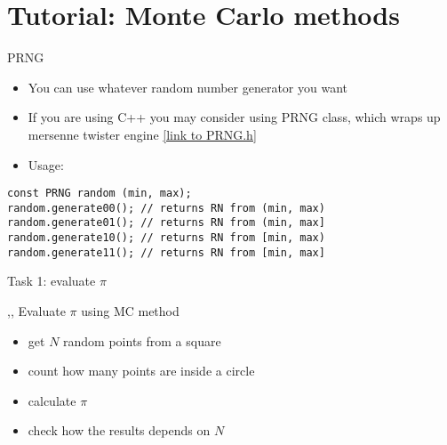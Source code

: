 \section[toc=Tutorial MC]{Tutorial: Monte Carlo methods}

\begin{slide}[method=direct]{PRNG}
\null\vfill

  \begin{itemize}
   \item You can use whatever random number generator you want
   \item If you are using C++ you may consider using PRNG class, which wraps up mersenne twister engine \href{https://raw.githubusercontent.com/TomaszGolan/simpleClassifiers/master/include/PRNG.h}{[link to PRNG.h]}
   \item Usage:
   
  \end{itemize}

  \begin{verbatim}
const PRNG random (min, max);
random.generate00(); // returns RN from (min, max)
random.generate01(); // returns RN from (min, max]
random.generate10(); // returns RN from [min, max)
random.generate11(); // returns RN from [min, max]
   \end{verbatim}

\vfill\null
\end{slide}

\begin{slide}[toc = Task 1]{Task 1: evaluate $\pi$}
\null\vfill

  \twocolumn
  {
    \sep\sep
    Evaluate $\pi$ using MC method
    \begin{itemize}
      \item get $N$ random points from a square
      \item count how many points are inside a circle
      \item calculate $\pi$
    \item check how the results depends on $N$
    \end{itemize}
  }
  {
    
  }

\vfill\null
\end{slide}

